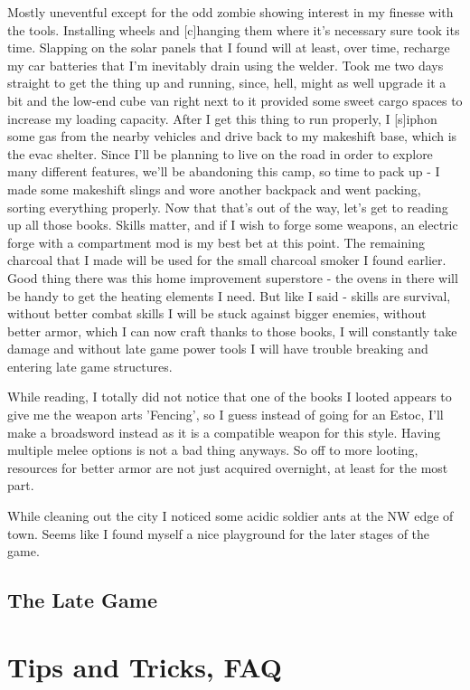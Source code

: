 \documentclass[11pt]{report}
\begin{document}
Mostly uneventful except for the odd zombie showing interest in my finesse with the tools. Installing wheels and [c]hanging them where it's necessary sure took its time. Slapping on the solar panels that I found will at least, over time, recharge my car batteries that I'm inevitably drain using the welder. Took me two days straight to get the thing up and running, since, hell, might as well upgrade it a bit and the low-end cube van right next to it provided some sweet cargo spaces to increase my loading capacity. After I get this thing to run properly, I [s]iphon some gas from the nearby vehicles and drive back to my makeshift base, which is the evac shelter. Since I'll be planning to live on the road in order to explore many different features, we'll be abandoning this camp, so time to pack up - I made some makeshift slings and wore another backpack and went packing, sorting everything properly. Now that that's out of the way, let's get to reading up all those books. Skills matter, and if I wish to forge some weapons, an electric forge with a compartment mod is my best bet at this point. The remaining charcoal that I made will be used for the small charcoal smoker I found earlier. Good thing there was this home improvement superstore - the ovens in there will be handy to get the heating elements I need.
But like I said - skills are survival, without better combat skills I will be stuck against bigger enemies, without better armor, which I can now craft thanks to those books, I will constantly take damage and without late game power tools I will have trouble breaking and entering late game structures.

While reading, I totally did not notice that one of the books I looted appears to give me the weapon arts 'Fencing', so I guess instead of going for an Estoc, I'll make a broadsword instead as it is a compatible weapon for this style. Having multiple melee options is not a bad thing anyways. So off to more looting, resources for better armor are not just acquired overnight, at least for the most part.

While cleaning out the city I noticed some acidic soldier ants at the NW edge of town. Seems like I found myself a nice playground for the later stages of the game.

\section{The Late Game}


\chapter{Tips and Tricks, FAQ}
\end{document}
